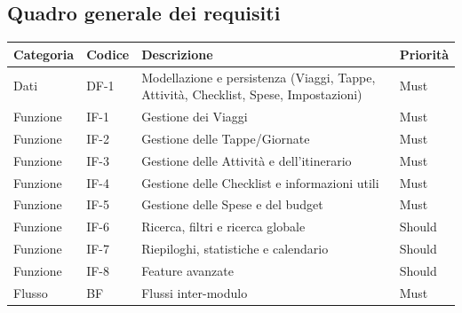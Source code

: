 \documentclass[11pt, a4paper]{article}
\begin{document}
\subsection{Quadro generale dei requisiti}
\begin{table}[h!]
    \centering
    \renewcommand{\arraystretch}{1.3}
    \begin{tabularx}{\textwidth}{>{\raggedright\arraybackslash}p{3cm} l X l}
        \toprule
        \textbf{Categoria} & \textbf{Codice} & \textbf{Descrizione} & \textbf{Priorità} \\
        \midrule
        Dati & DF-1 & Modellazione e persistenza (Viaggi, Tappe, Attività, Checklist, Spese, Impostazioni) & Must \\
        Funzione & IF-1 & Gestione dei Viaggi & Must \\
        Funzione & IF-2 & Gestione delle Tappe/Giornate & Must \\
        Funzione & IF-3 & Gestione delle Attività e dell'itinerario & Must \\
        Funzione & IF-4 & Gestione delle Checklist e informazioni utili & Must \\
        Funzione & IF-5 & Gestione delle Spese e del budget & Must \\
        Funzione & IF-6 & Ricerca, filtri e ricerca globale & Should \\
        Funzione & IF-7 & Riepiloghi, statistiche e calendario & Should \\
        Funzione & IF-8 & Feature avanzate & Should \\
        Flusso & BF & Flussi inter-modulo & Must \\
        \bottomrule
    \end{tabularx}
\end{table}
\end{document}

